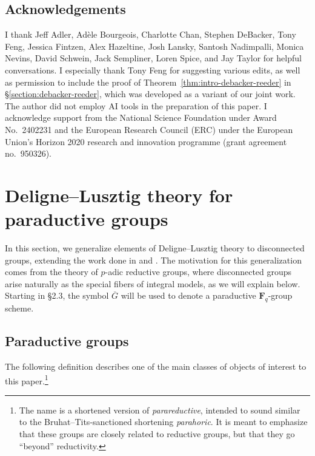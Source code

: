 \documentclass[reqno]{amsart}
\numberwithin{equation}{subsection}
\newcommand{\F}{\mathbf{F}}
\newcommand{\ol}[1]{\overline{#1}}
\theoremstyle{remark}
\numberwithin{equation}{subsection}
\numberwithin{figure}{subsection}
\begin{document}
\subsection{Acknowledgements}

I thank Jeff Adler, Ad\`ele Bourgeois, Charlotte Chan, Stephen DeBacker, Tony Feng, Jessica Fintzen, Alex Hazeltine, Josh Lansky, Santosh Nadimpalli, Monica Nevins, David Schwein, Jack Sempliner, Loren Spice, and Jay Taylor for helpful conversations. I especially thank Tony Feng for suggesting various edits, as well as permission to include the proof of Theorem~\ref{thm:intro-debacker-reeder} in \S\ref{section:debacker-reeder}, which was developed as a variant of our joint work. The author did not employ AI tools in the preparation of this paper.
I acknowledge support from the National Science Foundation under Award No.\ 2402231 and the European Research Council (ERC) under the
European Union’s Horizon 2020 research and innovation programme (grant agreement no.\ 950326).











\section{Deligne--Lusztig theory for paraductive groups}\label{section:extended-dl-theory}

In this section, we generalize elements of Deligne--Lusztig theory to disconnected groups, extending the work done in \cite[\S 2]{Kal21b} and \cite{DM94}. The motivation for this generalization comes from the theory of $p$-adic reductive groups, where disconnected groups arise naturally as the special fibers of integral models, as we will explain below. Starting in \S2.3, the symbol $\ol G$ will be used to denote a paraductive $\F_q$-group scheme.

\subsection{Paraductive groups}\label{ss:main-paraductive-example}

The following definition describes one of the main classes of objects of interest to this paper.\footnote{The name is a shortened version of \emph{parareductive}, intended to sound similar to the Bruhat--Tits-sanctioned shortening \emph{parahoric}. It is meant to emphasize that these groups are closely related to reductive groups, but that they go ``beyond'' reductivity.}
\end{document}
